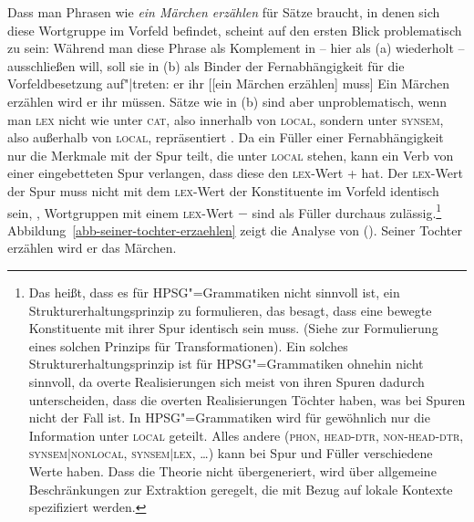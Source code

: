 Dass man Phrasen wie \emph{ein Märchen erzählen} für Sätze braucht, in denen sich diese Wortgruppe im Vorfeld
befindet, scheint auf den ersten Blick problematisch zu sein: Während man diese Phrase als Komplement
in  -- hier als (a) wiederholt -- ausschließen will,
soll sie in (b) als Binder der Fernabhängigkeit
für die Vorfeldbesetzung auf"|treten:
\eal
\ex er ihr [[ein Märchen erzählen] muss]
\ex Ein Märchen erzählen wird er ihr müssen.
\zl
Sätze wie in (b) sind aber unproblematisch, wenn man \textsc{lex} nicht wie \cite[]{ps2}
unter \textsc{cat}, also innerhalb von \textsc{local}, sondern unter \textsc{synsem}, also außerhalb von
\textsc{local}, repräsentiert \citep{Mueller96a,Mueller99a,Mueller2002b,Meurers99a}.
Da ein Füller einer Fernabhängigkeit nur die Merkmale mit der Spur teilt, die unter \textsc{local} stehen,
kann ein Verb von einer eingebetteten Spur verlangen, dass diese den \textsc{lex}-Wert + hat. Der \textsc{lex}-Wert
der Spur muss nicht mit dem \textsc{lex}-Wert der Konstituente im Vorfeld identisch sein,
\dash, Wortgruppen mit einem \textsc{lex}-Wert $-$ sind als Füller durchaus
zulässig.\footnote{
        Das heißt, dass es für HPSG"=Grammatiken nicht sinnvoll ist, ein Strukturerhaltungsprinzip
        zu formulieren,
        das besagt, dass eine bewegte Konstituente mit ihrer Spur identisch sein muss. (Siehe \zb
         zur Formulierung eines solchen Prinzips für Transformationen). Ein solches Strukturerhaltungsprinzip
        ist für HPSG"=Grammatiken ohnehin nicht sinnvoll, da overte Realisierungen sich meist von
        ihren Spuren dadurch unterscheiden, dass die overten Realisierungen Töchter haben, was bei Spuren
        nicht der Fall ist. In HPSG"=Grammatiken wird für gewöhnlich nur die Information unter \textsc{local}
        geteilt. Alles andere (\textsc{phon}, \textsc{head-dtr}, \textsc{non-head-dtr}, \textsc{synsem$|$nonlocal},
        \textsc{synsem$|$lex}, \ldots) kann bei Spur und Füller verschiedene Werte haben. Dass die Theorie nicht übergeneriert,
        wird über allgemeine Beschränkungen zur Extraktion geregelt, die mit Bezug auf lokale Kontexte
        spezifiziert werden.%
}
Abbildung~\vref{abb-seiner-tochter-erzaehlen} zeigt die Analyse von ().
\ea
Seiner Tochter erzählen wird er das Märchen.
\z
